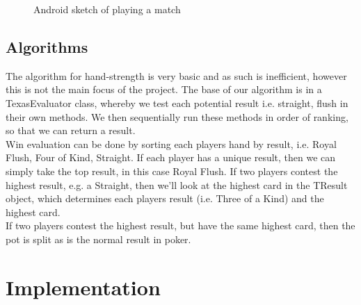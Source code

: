 \documentclass[11pt]{article}
\begin{document}
\begin{figure}[h]
	\caption{Android sketch of playing a match}
	
\end{figure} 

\newpage


\subsection{Algorithms}

The algorithm for hand-strength is very basic and as such is inefficient, however this is not the main focus of the project. The base of our algorithm is in a TexasEvaluator class, whereby we test each potential result i.e. straight, flush in their own methods. We then sequentially run these methods in order of ranking, so that we can return a result. \\


Win evaluation can be done by sorting each players hand by result, i.e. Royal Flush, Four of Kind, Straight. If each player has a unique result, then we can simply take the top result, in this case Royal Flush. If two players contest the highest result, e.g. a Straight, then we'll look at the highest card in the TResult object, which determines each players result (i.e. Three of a Kind) and the highest card. \\

If two players contest the highest result, but have the same highest card, then the pot is split as is the normal result in poker. 

\section{Implementation}
\end{document}
